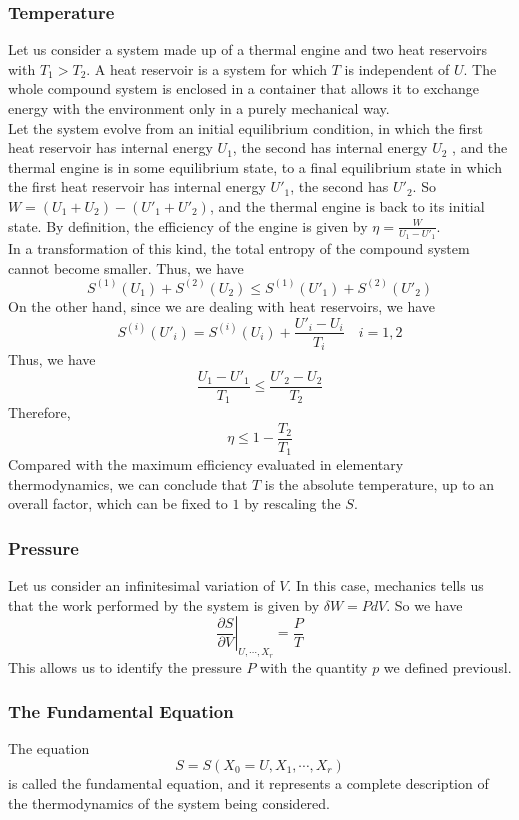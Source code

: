 \subsubsection{Temperature}
Let us consider a system made up of a thermal engine and two heat reservoirs with $T_1 > T_2$. A heat reservoir is a system for which $T$ is independent of $U$. The whole compound system is enclosed in a container that allows it to exchange energy with the environment only in a purely mechanical way. 
\\
Let the system evolve from an initial equilibrium condition, in which the first heat reservoir has internal energy $U_1$, the second has internal energy $U_2$ , and the thermal engine is in some equilibrium state, to a final equilibrium state in which the first heat reservoir has internal energy $U'_1$, the second has $U'_2$. So $W = (U_1 + U_2 ) - (U'_1 + U'_2)$, and the thermal engine is back to its initial state. By definition, the efficiency of the engine is given by $\eta = \frac{W}{U_1 - U'_1}$.
\\
In a transformation of this kind, the total entropy of the compound system cannot become smaller. Thus, we have
\[S^{(1)}(U_1) + S^{(2)}(U_2) \leq S^{(1)}(U'_1) + S^{(2)}(U'_2)\]
On the other hand, since we are dealing with heat reservoirs, we have
\[S^{(i)}(U'_i) = S^{(i)}(U_i) + \frac{U'_i - U_i}{T_i} \quad i = 1,2\]
Thus, we have
\[\frac{U_1 - U'_1}{T_1} \leq \frac{U'_2 - U_2}{T_2}\]
Therefore,
\[\eta \leq 1 - \frac{T_2}{T_1}\]
Compared with the maximum efficiency evaluated in elementary thermodynamics, we can conclude that $T$ is the absolute temperature, up to an overall factor, which can be fixed to $1$ by rescaling the $S$. 

\subsubsection{Pressure}
Let us consider an infinitesimal variation of $V$. In this case, mechanics tells us that the work performed by the system is given by $\delta W = PdV$. So we have
\[\left. \frac{\partial S}{\partial V} \right|_{U,\cdots,X_r} = \frac{P}{T}\]
This allows us to identify the pressure $P$ with the quantity $p$ we defined previousl.


\subsubsection{The Fundamental Equation}
The equation
\[S = S(X_0 = U, X_1, \cdots, X_r)\]
is called the fundamental equation, and it represents a complete description of the thermodynamics of the system being considered.

